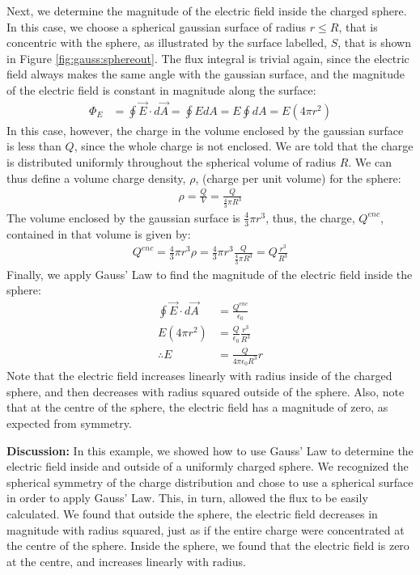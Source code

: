\begin{example}
Next, we determine the magnitude of the electric field inside the charged sphere. In this case, we choose a spherical gaussian surface of radius $r\leq R$, that is concentric with the sphere, as illustrated by the surface labelled, $S$, that is shown in Figure \ref{fig:gauss:sphereout}.
The flux integral is trivial again, since the electric field always makes the same angle with the gaussian surface, and the magnitude of the electric field is constant in magnitude along the surface:
\begin{align*}
\Phi_E&=\oint \vec E\cdot d\vec A=\oint E dA= E\oint dA=E(4\pi r^2)
\end{align*}
In this case, however, the charge in the volume enclosed by the gaussian surface is less than $Q$, since the whole charge is not enclosed. We are told that the charge is distributed uniformly throughout the spherical volume of radius $R$. We can thus define a volume charge density, $\rho$, (charge per unit volume) for the sphere:
\begin{align*}
\rho=\frac{Q}{V}=\frac{Q}{\frac{4}{3}\pi R^3}
\end{align*}
The volume enclosed by the gaussian surface is $\frac{4}{3}\pi r^3$, thus, the charge, $Q^{enc}$, contained in that volume is given by:
\begin{align*}
Q^{enc}=\frac{4}{3}\pi r^3 \rho=\frac{4}{3}\pi r^3 \frac{Q}{\frac{4}{3}\pi R^3}=Q\frac{r^3}{R^3}
\end{align*}
Finally, we apply Gauss' Law to find the magnitude of the electric field inside the sphere:
\begin{align*}
\oint \vec E\cdot d\vec A&=\frac{Q^{enc}}{\epsilon_0} \\
E(4\pi r^2) &=\frac{Q}{\epsilon_0}\frac{r^3}{R^3}\\
\therefore E&= \frac{Q}{4\pi\epsilon_0R^3}r
\end{align*}
Note that the electric field increases linearly with radius inside of the charged sphere, and then decreases with radius squared outside of the sphere. Also, note that at the centre of the sphere, the electric field has a magnitude of zero, as expected from symmetry.

\textbf{Discussion: } In this example, we showed how to use Gauss' Law to determine the electric field inside and outside of a uniformly charged sphere. We recognized the spherical symmetry of the charge distribution and chose to use a spherical surface in order to apply Gauss' Law. This, in turn, allowed the flux to be easily calculated. We found that outside the sphere, the electric field decreases in magnitude with radius squared, just as if the entire charge were concentrated at the centre of the sphere. Inside the sphere, we found that the electric field is zero at the centre, and increases linearly with radius. 
\end{example}


